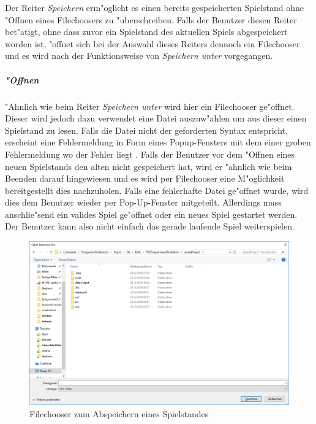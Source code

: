 Der Reiter \glqq \emph{Speichern}\grqq {} erm"oglicht es einen bereits gespeicherten Spielstand ohne "Offnen eines Filechoosers zu "uberschreiben. Falls der Benutzer diesen Reiter bet"atigt, ohne dass zuvor ein Spielstand des aktuellen Spiels abgespeichert worden ist, "offnet sich bei der Auswahl dieses Reiters dennoch ein Filechooser und es wird nach der Funktionsweise von \glqq \emph{Speichern unter}\grqq {} vorgegangen.

\subparagraph{"Offnen}
"Ahnlich wie beim Reiter \glqq \emph{Speichern unter}\grqq {} wird hier ein Filechooser ge"offnet. Dieser wird jedoch dazu verwendet eine Datei auszuw"ahlen um aus dieser einen Spielstand zu lesen. Falls die Datei nicht der geforderten Syntax entspricht, erscheint eine Fehlermeldung in Form eines Popup-Fensters mit dem einer groben Fehlermeldung wo der Fehler liegt . Falls der Benutzer vor dem "Offnen eines neuen Spielstands den alten nicht gespeichert hat, wird er "ahnlich wie beim Beenden darauf hingewiesen und es wird per Filechooser eine M"oglichkeit bereitgestellt dies nachzuholen. Falls eine fehlerhafte Datei ge"offnet wurde, wird dies dem Benutzer wieder per Pop-Up-Fenster mitgeteilt. Allerdings muss anschlie"send ein valides Spiel ge"offnet oder ein neues Spiel gestartet werden. Der Benutzer kann also nicht einfach das gerade laufende Spiel weiterspielen. 

\begin{figure}
	\centering
	\includegraphics{screenshots/screenshot_Filechooser}
	\caption[Filechooser]{Filechooser zum Abspeichern eines Spielstandes}
	\label{fig:filechooser}
\end{figure}

